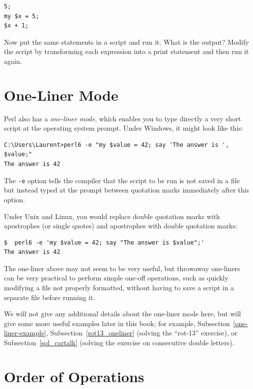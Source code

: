 \begin{verbatim}
5;
my $x = 5;
$x + 1;
\end{verbatim}

Now put the same statements in a script and run it.  What
is the output?  Modify the script by transforming each
expression into a print statement and then run it again.

\section{One-Liner Mode}

Perl also has a \emph{one-liner mode}, which enables you 
to type directly a very short script at the operating 
system prompt. Under Windows, it might look like this:
\label{one-liner mode}

\begin{verbatim}
C:\Users\Laurent>perl6 -e "my $value = 42; say 'The answer is ', $value;"
The answer is 42

\end{verbatim}

The {\tt -e} option tells the compiler that the script to 
be run is not saved in a file but instead typed at the 
prompt between quotation marks immediately after 
this option.

Under Unix and Linux, you would replace double quotation 
marks with apostrophes (or single quotes) 
and apostrophes with double quotation marks:

\begin{verbatim}
$  perl6 -e 'my $value = 42; say "The answer is $value";'
The answer is 42

\end{verbatim}

The one-liner above may not seem to be very useful, but 
throwaway one-liners can be very practical to perform 
simple one-off operations, such as quickly modifying 
a file not properly formatted, without having to save a script 
in a separate file before running it.

We will not give any additional details about the one-liner 
mode here, but will give some more useful examples 
later in this book; for example, 
Subsection~\ref{one-liner-example},
Subsection~\ref{rot13_oneliner} (solving the ``rot-13'' exercise), or
Subsection~\ref{sol_cartalk} (solving the exercise on 
consecutive double letters). 



\section{Order of Operations}

